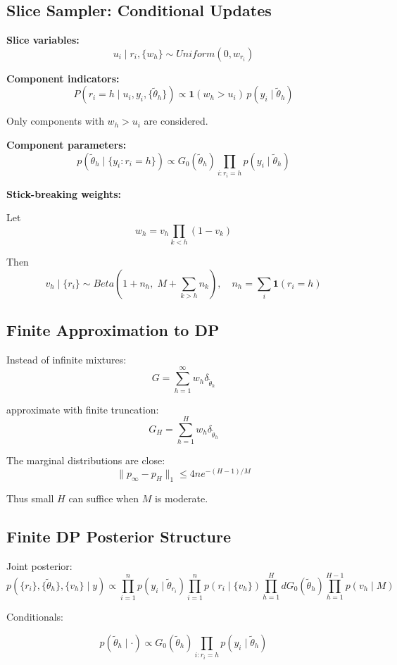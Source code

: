 \documentclass[12pt,oneside]{book}
\numberwithin{equation}{section}
\theoremstyle{definition}
\theoremstyle{plain}
\theoremstyle{remark}
\begin{document}
\subsection*{Slice Sampler: Conditional Updates}

\textbf{Slice variables:}
\[
u_i \mid r_i, \{w_h\} \sim Uniform(0, w_{r_i})
\]

\textbf{Component indicators:}
\[
P(r_i = h \mid u_i, y_i, \{\tilde{\theta}_h\})
\propto
\mathbf{1}(w_h > u_i)\, p(y_i \mid \tilde{\theta}_h)
\]

Only components with $w_h > u_i$ are considered.

\textbf{Component parameters:}
\[
p(\tilde{\theta}_h \mid \{y_i : r_i = h\})
\propto
G_0(\tilde{\theta}_h) \prod_{i:r_i=h} p(y_i \mid \tilde{\theta}_h)
\]

\textbf{Stick-breaking weights:}

Let
\[
w_h = v_h \prod_{k<h} (1 - v_k)
\]

Then
\[
v_h \mid \{r_i\}
\sim
Beta\left(1 + n_h,\; M + \sum_{k>h} n_k\right),
\quad
n_h = \sum_i \mathbf{1}(r_i = h)
\]

\subsection*{Finite Approximation to DP}

Instead of infinite mixtures:
\[
G = \sum_{h=1}^\infty w_h \delta_{\tilde{\theta}_h}
\]

approximate with finite truncation:
\[
G_H = \sum_{h=1}^H w_h \delta_{\tilde{\theta}_h}
\]

The marginal distributions are close:
\[
\| p_\infty - p_H \|_1 \le 4n e^{-(H-1)/M}
\]

Thus small $H$ can suffice when $M$ is moderate.

\subsection*{Finite DP Posterior Structure}

Joint posterior:
\[
p(\{r_i\}, \{\tilde{\theta}_h\}, \{v_h\} \mid y)
\propto
\prod_{i=1}^n p(y_i \mid \tilde{\theta}_{r_i})
\prod_{i=1}^n p(r_i \mid \{v_h\})
\prod_{h=1}^H dG_0(\tilde{\theta}_h)
\prod_{h=1}^{H-1} p(v_h \mid M)
\]

Conditionals:

\[
p(\tilde{\theta}_h \mid \cdot)
\propto
G_0(\tilde{\theta}_h) \prod_{i:r_i=h} p(y_i \mid \tilde{\theta}_h)
\]
\end{document}
